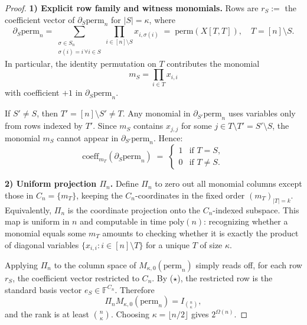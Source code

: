 \documentclass[12pt]{article}
\theoremstyle{definition}
\theoremstyle{definition}
\theoremstyle{remark}
\theoremstyle{remark}
\begin{document}
\begin{proof}
\textbf{1) Explicit row family and witness monomials.}
Rows are $r_S :=$ the coefficient vector of $\partial_S \mathrm{perm}_n$ for $|S| = \kappa$, where
\[
\partial_S \mathrm{perm}_n = \sum_{\substack{\sigma \in S_n \\ \sigma(i) = i\,\forall i \in S}} \prod_{i \in [n] \setminus S} x_{i,\sigma(i)} \;=\; \mathrm{perm}(X[T,T]), \quad T = [n] \setminus S.
\]
In particular, the identity permutation on $T$ contributes the monomial
\[
m_S = \prod_{i \in T} x_{i,i}
\]
with coefficient $+1$ in $\partial_S \mathrm{perm}_n$.

If $S' \neq S$, then $T' = [n] \setminus S' \neq T$. Any monomial in $\partial_{S'} \mathrm{perm}_n$ uses variables only from rows indexed by $T'$. Since $m_S$ contains $x_{j,j}$ for some $j \in T \setminus T' = S' \setminus S$, the monomial $m_S$ cannot appear in $\partial_{S'} \mathrm{perm}_n$. Hence:
\[
\mathrm{coeff}_{m_T}(\partial_S \mathrm{perm}_n) \;=\; \begin{cases}
1 & \text{if } T = S, \\
0 & \text{if } T \neq S.
\end{cases} \tag{$\star$}
\]

\textbf{2) Uniform projection $\Pi_n$.}
Define $\Pi_n$ to zero out all monomial columns except those in $C_n = \{m_T\}$, keeping the $C_n$-coordinates in the fixed order $(m_T)_{|T| = k}$. Equivalently, $\Pi_n$ is the coordinate projection onto the $C_n$-indexed subspace. This map is uniform in $n$ and computable in time $\mathrm{poly}(n)$: recognizing whether a monomial equals some $m_T$ amounts to checking whether it is exactly the product of diagonal variables $\{x_{i,i} : i \in [n] \setminus T\}$ for a unique $T$ of size $\kappa$.

Applying $\Pi_n$ to the column space of $M_{\kappa,0}(\mathrm{perm}_n)$ simply reads off, for each row $r_S$, the coefficient vector restricted to $C_n$. By ($\star$), the restricted row is the standard basis vector $e_S \in \mathbb{F}^{C_n}$. Therefore
\[
\Pi_n M_{\kappa,0}(\mathrm{perm}_n) = I_{\binom{n}{\kappa}},
\]
and the rank is at least $\binom{n}{\kappa}$. Choosing $\kappa = \lfloor n/2 \rfloor$ gives $2^{\Omega(n)}$.
\end{proof}
\end{document}
